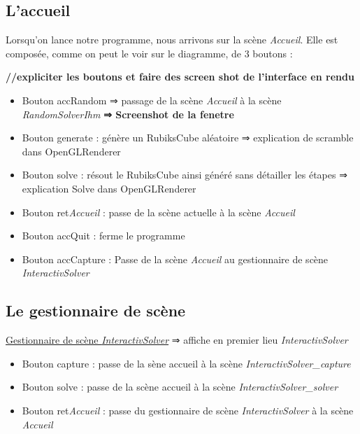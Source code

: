 \subsection{L'accueil}
Lorsqu’on lance notre programme, nous arrivons sur la scène \textit{Accueil}. Elle est composée, comme on peut le voir sur le diagramme, de 3 boutons :

\textbf{//expliciter les boutons et faire des screen shot de l’interface en rendu}
\begin{itemize}
    \item Bouton accRandom 
    ⇒ passage de la scène \textit{Accueil} à la scène \textit{RandomSolverIhm}
    \textbf{⇒ Screenshot de la fenetre}

    \item Bouton generate : génère un RubiksCube aléatoire
        ⇒ explication de scramble dans OpenGLRenderer

    \item Bouton solve : résout le RubiksCube ainsi généré sans détailler les étapes
        ⇒ explication Solve dans OpenGLRenderer

    \item Bouton ret\textit{Accueil} : passe de la scène actuelle à la scène \textit{Accueil}

    \item Bouton accQuit : ferme le programme

    \item Bouton accCapture : Passe de la scène \textit{Accueil} au gestionnaire de scène \textit{InteractivSolver}

\end{itemize}

\subsection{Le gestionnaire de scène}
\underline{Gestionnaire de scène \textit{InteractivSolver}}
⇒ affiche en premier lieu \textit{InteractivSolver}
\begin{itemize}
    \item Bouton capture : passe de la sène accueil à la scène \textit{InteractivSolver\_capture}
    \item Bouton solve : passe de la scène accueil à la scène \textit{InteractivSolver\_solver}
    \item Bouton ret\textit{Accueil} : passe du gestionnaire de scène \textit{InteractivSolver} à la scène \textit{Accueil}
\end{itemize}

